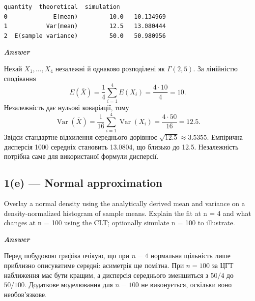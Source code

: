 \documentclass[11pt]{article}
\begin{document}
    
    \begin{Verbatim}[commandchars=\\\{\}]
             quantity  theoretical  simulation
0             E(mean)         10.0   10.134969
1           Var(mean)         12.5   13.080444
2  E(sample variance)         50.0   50.980956
    \end{Verbatim}

    
    \textbf{\emph{Answer}}

Нехай \(X_1,\ldots,X_4\) незалежні й однаково розподілені як
\(\Gamma(2,5)\). За лінійністю сподівання
\[E(\bar X)=\frac14\sum_{i=1}^4E(X_i)=\frac{4\cdot10}{4}=10.\]
Незалежність дає нульові коваріації, тому
\[\operatorname{Var}(\bar X)=\frac1{16}\sum_{i=1}^4\operatorname{Var}(X_i)=\frac{4\cdot50}{16}=12.5.\]
Звідси стандартне відхилення середнього дорівнює
\(\sqrt{12.5}\approx3.5355\). Емпірична дисперсія 1000 середніх
становить 13.0804, що близько до 12.5. Незалежність потрібна саме для
використаної формули дисперсії.

    \subsection{1(e) --- Normal approximation}\label{e-normal-approximation}

Overlay a normal density using the analytically derived mean and
variance on a density-normalized histogram of sample means. Explain the
fit at n = 4 and what changes at n = 100 using the CLT; optionally
simulate n = 100 to illustrate.

    \textbf{\emph{Answer}}

Перед побудовою графіка очікую, що при \(n=4\) нормальна щільність лише
приблизно описуватиме середні: асиметрія ще помітна. При \(n=100\) за
ЦГТ наближення має бути кращим, а дисперсія середнього зменшиться з
\(50/4\) до \(50/100\). Додаткове моделювання для \(n=100\) не
виконується, оскільки воно необов'язкове.
\end{document}

